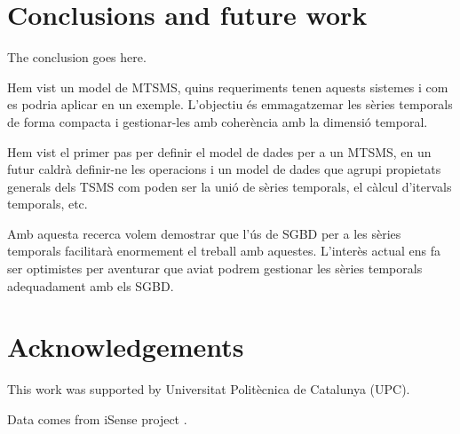 \documentclass{scrartcl}
\begin{document}
\section{Conclusions and future work} 
The conclusion goes here.

Hem vist un model de MTSMS, quins requeriments tenen aquests sistemes i com es podria aplicar en un exemple. L'objectiu és emmagatzemar les sèries temporals de forma compacta i gestionar-les amb coherència amb la dimensió temporal. 

Hem vist el primer pas per definir el model de dades per a un MTSMS, en un futur caldrà definir-ne les operacions i un model de dades que agrupi propietats generals dels TSMS com poden ser la unió de sèries temporals, el càlcul d'itervals temporals, etc.

Amb aquesta recerca volem demostrar que l'ús de SGBD per a les sèries temporals facilitarà enormement el treball amb aquestes.
L'interès actual ens fa ser optimistes per aventurar que aviat podrem gestionar les sèries temporals adequadament amb els SGBD.



\section*{Acknowledgements}

This work was supported by Universitat Polit\`{e}cnica de Catalunya (UPC).

Data comes from iSense project .

\printbibliography{}
% 






\end{document}
